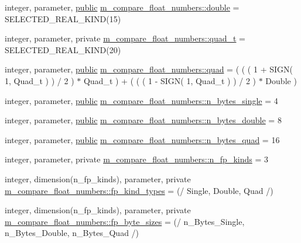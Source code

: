 \begin{DoxyCompactItemize}
\item 
integer, parameter, \hyperlink{M__stopwatch_83_8txt_a2f74811300c361e53b430611a7d1769f}{public} \hyperlink{namespacem__compare__float__numbers_af4b789cd6e1a2abcd412eaf29e91ea0c}{m\+\_\+compare\+\_\+float\+\_\+numbers\+::double} = S\+E\+L\+E\+C\+T\+E\+D\+\_\+\+R\+E\+A\+L\+\_\+\+K\+I\+ND(15)
\item 
integer, parameter, private \hyperlink{namespacem__compare__float__numbers_a3cb67561a1bb5038eddb1aafcce81199}{m\+\_\+compare\+\_\+float\+\_\+numbers\+::quad\+\_\+t} = S\+E\+L\+E\+C\+T\+E\+D\+\_\+\+R\+E\+A\+L\+\_\+\+K\+I\+ND(20)
\item 
integer, parameter, \hyperlink{M__stopwatch_83_8txt_a2f74811300c361e53b430611a7d1769f}{public} \hyperlink{namespacem__compare__float__numbers_af11cd62e9032de86b00de623b4eb5c2c}{m\+\_\+compare\+\_\+float\+\_\+numbers\+::quad} = ( ( ( 1 + S\+I\+GN( 1, Quad\+\_\+t ) ) / 2 ) $\ast$ Quad\+\_\+t ) + ( ( ( 1 -\/ S\+I\+GN( 1, Quad\+\_\+t ) ) / 2 ) $\ast$ Double )
\item 
integer, parameter, \hyperlink{M__stopwatch_83_8txt_a2f74811300c361e53b430611a7d1769f}{public} \hyperlink{namespacem__compare__float__numbers_a8d387475f5c4f6cc89da998183cf9077}{m\+\_\+compare\+\_\+float\+\_\+numbers\+::n\+\_\+bytes\+\_\+single} = 4
\item 
integer, parameter, \hyperlink{M__stopwatch_83_8txt_a2f74811300c361e53b430611a7d1769f}{public} \hyperlink{namespacem__compare__float__numbers_a801fa0d9fea2f2c025618157c128bfe2}{m\+\_\+compare\+\_\+float\+\_\+numbers\+::n\+\_\+bytes\+\_\+double} = 8
\item 
integer, parameter, \hyperlink{M__stopwatch_83_8txt_a2f74811300c361e53b430611a7d1769f}{public} \hyperlink{namespacem__compare__float__numbers_abbe80858664126778bff36ea408c71dc}{m\+\_\+compare\+\_\+float\+\_\+numbers\+::n\+\_\+bytes\+\_\+quad} = 16
\item 
integer, parameter, private \hyperlink{namespacem__compare__float__numbers_ae5e226645a7448efabc625aa89e78a20}{m\+\_\+compare\+\_\+float\+\_\+numbers\+::n\+\_\+fp\+\_\+kinds} = 3
\item 
integer, dimension(n\+\_\+fp\+\_\+kinds), parameter, private \hyperlink{namespacem__compare__float__numbers_aa90581babf075fb76565a7ac27674522}{m\+\_\+compare\+\_\+float\+\_\+numbers\+::fp\+\_\+kind\+\_\+types} = (/ Single, Double, Quad /)
\item 
integer, dimension(n\+\_\+fp\+\_\+kinds), parameter, private \hyperlink{namespacem__compare__float__numbers_a24daff6e230d11a5d81a10bf1c055841}{m\+\_\+compare\+\_\+float\+\_\+numbers\+::fp\+\_\+byte\+\_\+sizes} = (/ n\+\_\+\+Bytes\+\_\+\+Single, n\+\_\+\+Bytes\+\_\+\+Double, n\+\_\+\+Bytes\+\_\+\+Quad /)

\end{DoxyCompactItemize}
